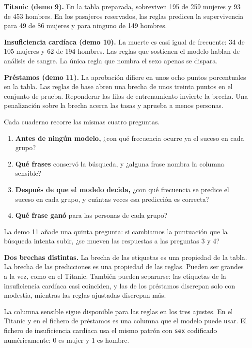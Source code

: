 \documentclass[11pt]{article}
\newcommand{\fn}[1]{\texttt{\small #1}}
\begin{document}
\begin{lesson}
\textbf{Titanic (demo 9).} En la tabla preparada, sobreviven 195 de 259 mujeres y 93 de 453 hombres. En los pasajeros reservados, las reglas predicen la supervivencia para 49 de 86 mujeres y para ninguno de 149 hombres.

\textbf{Insuficiencia cardíaca (demo 10).} La muerte es casi igual de frecuente: 34 de 105 mujeres y 62 de 194 hombres. Las reglas que sostienen el modelo hablan de análisis de sangre. La única regla que nombra el sexo apenas se dispara.

\textbf{Préstamos (demo 11).} La aprobación difiere en unos ocho puntos porcentuales en la tabla. Las reglas de base abren una brecha de unos treinta puntos en el conjunto de prueba. Reponderar las filas de entrenamiento invierte la brecha. Una penalización sobre la brecha acerca las tasas y aprueba a menos personas.
\end{lesson}

Cada cuaderno recorre las mismas cuatro preguntas.

\begin{enumerate}
  \item \textbf{Antes de ningún modelo,} ¿con qué frecuencia ocurre ya el suceso en cada grupo?
  \item \textbf{Qué frases} conservó la búsqueda, y ¿alguna frase nombra la columna sensible?
  \item \textbf{Después de que el modelo decida,} ¿con qué frecuencia se predice el suceso en cada grupo, y cuántas veces esa predicción es correcta?
  \item \textbf{Qué frase ganó} para las personas de cada grupo?
\end{enumerate}

La demo 11 añade una quinta pregunta: si cambiamos la puntuación que la búsqueda intenta subir, ¿se mueven las respuestas a las preguntas 3 y 4?

\begin{idea}
\textbf{Dos brechas distintas.} La brecha de las etiquetas es una propiedad de la tabla. La brecha de las predicciones es una propiedad de las reglas. Pueden ser grandes a la vez, como en el Titanic. También pueden separarse: las etiquetas de la insuficiencia cardíaca casi coinciden, y las de los préstamos discrepan solo con modestia, mientras las reglas ajustadas discrepan más.
\end{idea}

La columna sensible sigue disponible para las reglas en los tres ajustes. En el Titanic y en el fichero de préstamos es una columna que el modelo puede usar. El fichero de insuficiencia cardíaca usa el mismo patrón con \fn{sex} codificado numéricamente: 0 es mujer y 1 es hombre.
\end{document}
